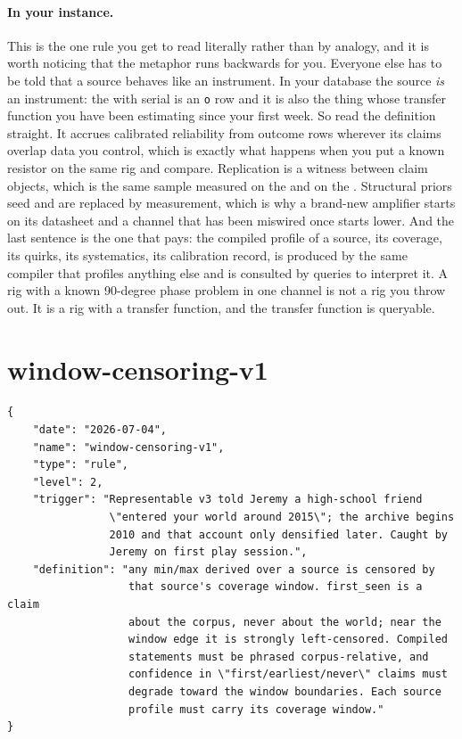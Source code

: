 \paragraph{In your instance.} This is the one rule you get to read literally rather than by analogy, and it is worth noticing that the metaphor runs backwards for you. Everyone else has to be told that a source behaves like an instrument. In your database the source \emph{is} an instrument: the \labLockin{} with serial \texttt{\labDeviceSerial} is an \texttt{o} row and it is also the thing whose transfer function you have been estimating since your first week. So read the definition straight. It accrues calibrated reliability from outcome rows wherever its claims overlap data you control, which is exactly what happens when you put a known resistor on the same rig and compare. Replication is a witness between claim objects, which is the same sample measured on the \labColdSystemColloquial{} and on the \labColdSystemAlt. Structural priors seed and are replaced by measurement, which is why a brand-new amplifier starts on its datasheet and a channel that has been miswired once starts lower. And the last sentence is the one that pays: the compiled profile of a source, its coverage, its quirks, its systematics, its calibration record, is produced by the same compiler that profiles anything else and is consulted by queries to interpret it. A rig with a known 90-degree phase problem in one channel is not a rig you throw out. It is a rig with a transfer function, and the transfer function is queryable.

\section{window-censoring-v1}

\begin{lstlisting}[language={},basicstyle=\ttfamily\footnotesize]
{
    "date": "2026-07-04",
    "name": "window-censoring-v1",
    "type": "rule",
    "level": 2,
    "trigger": "Representable v3 told Jeremy a high-school friend
                \"entered your world around 2015\"; the archive begins
                2010 and that account only densified later. Caught by
                Jeremy on first play session.",
    "definition": "any min/max derived over a source is censored by
                   that source's coverage window. first_seen is a claim
                   about the corpus, never about the world; near the
                   window edge it is strongly left-censored. Compiled
                   statements must be phrased corpus-relative, and
                   confidence in \"first/earliest/never\" claims must
                   degrade toward the window boundaries. Each source
                   profile must carry its coverage window."
}
\end{lstlisting}

